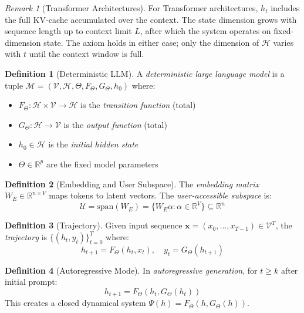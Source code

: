 \documentclass[11pt]{article}
\theoremstyle{definition}
\newtheorem{definition}{Definition}[section]
\theoremstyle{remark}
\newtheorem{remark}{Remark}[section]
\begin{document}
\begin{remark}[Transformer Architectures]
For Transformer architectures, $h_t$ includes the full KV-cache accumulated over the context. The state dimension grows with sequence length up to context limit $L$, after which the system operates on fixed-dimension state. The axiom holds in either case; only the dimension of $\mathcal{H}$ varies with $t$ until the context window is full.
\end{remark}

\begin{definition}[Deterministic LLM]
A \emph{deterministic large language model} is a tuple $\mathcal{M} = (\mathcal{V}, \mathcal{H}, \Theta, F_\Theta, G_\Theta, h_0)$ where:
\begin{itemize}[nosep, topsep=0.3em]
    \item $F_\Theta: \mathcal{H} \times \mathcal{V} \to \mathcal{H}$ is the \emph{transition function} (total)
    \item $G_\Theta: \mathcal{H} \to \mathcal{V}$ is the \emph{output function} (total)
    \item $h_0 \in \mathcal{H}$ is the \emph{initial hidden state}
    \item $\Theta \in \mathbb{R}^p$ are the fixed model parameters
\end{itemize}
\end{definition}

\begin{definition}[Embedding and User Subspace]
The \emph{embedding matrix} $W_E \in \mathbb{R}^{n \times V}$ maps tokens to latent vectors. The \emph{user-accessible subspace} is:
\begin{equation}
\mathcal{U} = \mathrm{span}(W_E) = \{W_E \alpha : \alpha \in \mathbb{R}^V\} \subseteq \mathbb{R}^n
\end{equation}
\end{definition}

\begin{definition}[Trajectory]
Given input sequence $\mathbf{x} = (x_0, \ldots, x_{T-1}) \in \mathcal{V}^T$, the \emph{trajectory} is $\{(h_t, y_t)\}_{t=0}^{T}$ where:
\begin{equation}
h_{t+1} = F_\Theta(h_t, x_t), \quad y_t = G_\Theta(h_{t+1})
\end{equation}
\end{definition}

\begin{definition}[Autoregressive Mode]
In \emph{autoregressive generation}, for $t \geq k$ after initial prompt:
\begin{equation}
h_{t+1} = F_\Theta(h_t, G_\Theta(h_t))
\end{equation}
This creates a closed dynamical system $\Psi(h) = F_\Theta(h, G_\Theta(h))$.
\end{definition}
\end{document}
